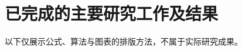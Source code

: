 \section{已完成的主要研究工作及结果}
以下仅展示公式、算法与图表的排版方法，不属于实际研究成果。



\FloatBarrier

\ifIncludeAIStatement
  
\fi

